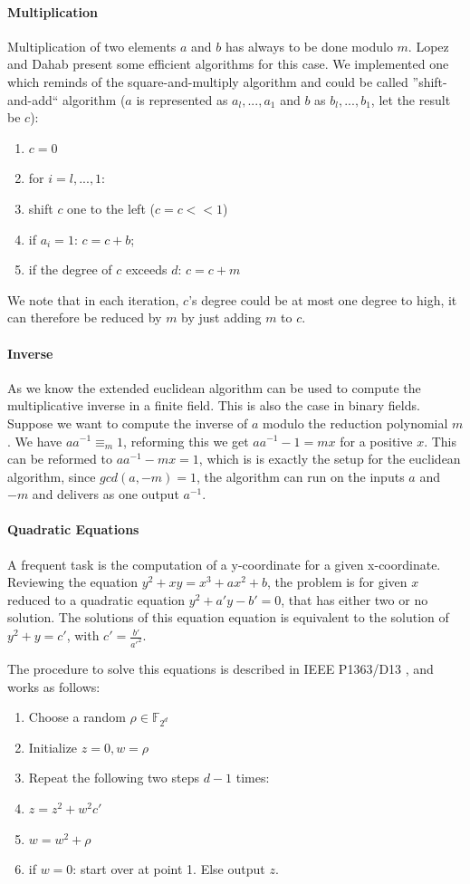 \documentclass[11pt,english]{article}
\begin{document}
\paragraph{Multiplication}
Multiplication of two elements $a$ and $b$ has always to be done modulo $m$. Lopez and Dahab \cite{715867} present some efficient algorithms for this case. We implemented one which reminds of the square-and-multiply algorithm and could be called ''shift-and-add`` algorithm ($a$ is represented as $a_l,...,a_1$ and $b$ as $b_l,...,b_1$, let the result be $c$):
\begin{enumerate}
 \item $c=0$
 \item for $i=l,...,1$:
 \item shift $c$ one to the left ($c=c<<1$)
 \item if $a_i=1$: $c=c+b$;
 \item if the degree of $c$ exceeds $d$: $c=c+m$
\end{enumerate}
We note that in each iteration, $c$'s degree could be at most one degree to high, it can therefore be reduced by $m$ by just adding $m$ to $c$.

\paragraph{Inverse}
As we know the extended euclidean algorithm can be used to compute the multiplicative inverse in a finite field. This is also the case in binary fields. Suppose we want to compute the inverse of $a$ modulo the reduction polynomial $m$. We have $aa^{-1}\equiv_m 1$, reforming this we get $aa^{-1}-1=mx$ for a positive $x$. This can be reformed to $aa^{-1}-mx=1$, which is is exactly the setup for the euclidean algorithm, since $gcd(a,-m)=1$, the algorithm can run on the inputs $a$ and $-m$ and delivers as one output $a^{-1}$.

\paragraph{Quadratic Equations}
\label{binquadeq}
A frequent task is the computation of a y-coordinate for a given x-coordinate. Reviewing the equation $y^2+xy=x^3+ax^2+b$, the problem is for given $x$ reduced to a quadratic equation $y^2+a'y-b'=0$, that has either two or no solution. The solutions of this equation equation is equivalent to the solution of $y^2+y=c'$, with $c'=\frac{b'}{a'^2}$.

The procedure to solve this equations is described in IEEE P1363/D13 \cite{point-decompress}, and works as follows:
\begin{enumerate}
 \item Choose a random $\rho\in\mathbb{F}_{2^d}$
 \item Initialize $z=0,w=\rho$
 \item Repeat the following two steps $d-1$ times:
 \item $z=z^2+w^2c'$
 \item $w=w^2+\rho$
 \item if $w=0$: start over at point 1. Else output $z$.
\end{enumerate}
\end{document}
